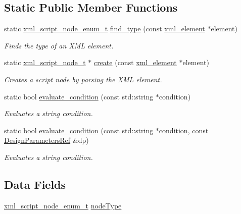 \subsection*{Static Public Member Functions}
\begin{DoxyCompactItemize}
\item 
static \hyperlink{xml__script__command_8hpp_a3f764b80e60a34ae77719e7f4616a59b}{xml\+\_\+script\+\_\+node\+\_\+enum\+\_\+t} \hyperlink{classxml__script__node__t_aca8e03906a47471b458570a203829aa3}{find\+\_\+type} (const \hyperlink{classxml__element}{xml\+\_\+element} $\ast$element)
\begin{DoxyCompactList}\small\item\em Finds the type of an X\+ML element. \end{DoxyCompactList}\item 
static \hyperlink{classxml__script__node__t}{xml\+\_\+script\+\_\+node\+\_\+t} $\ast$ \hyperlink{classxml__script__node__t_aed7d38abc27f6750b763da3ccd7b4b87}{create} (const \hyperlink{classxml__element}{xml\+\_\+element} $\ast$element)
\begin{DoxyCompactList}\small\item\em Creates a script node by parsing the X\+ML element. \end{DoxyCompactList}\item 
static bool \hyperlink{classxml__script__node__t_a01f5c0deca615d53775e40a512be3226}{evaluate\+\_\+condition} (const std\+::string $\ast$condition)
\begin{DoxyCompactList}\small\item\em Evaluates a string condition. \end{DoxyCompactList}\item 
static bool \hyperlink{classxml__script__node__t_ad27af696d98812f71634159dd6f5052c}{evaluate\+\_\+condition} (const std\+::string $\ast$condition, const \hyperlink{DesignParameters_8hpp_ae36bb1c4c9150d0eeecfe1f96f42d157}{Design\+Parameters\+Ref} \&dp)
\begin{DoxyCompactList}\small\item\em Evaluates a string condition. \end{DoxyCompactList}\end{DoxyCompactItemize}
\subsection*{Data Fields}
\begin{DoxyCompactItemize}
\item 
\hyperlink{xml__script__command_8hpp_a3f764b80e60a34ae77719e7f4616a59b}{xml\+\_\+script\+\_\+node\+\_\+enum\+\_\+t} \hyperlink{classxml__script__node__t_aaf981f64fd03ed4d8afbacd9f1cdbe2c}{node\+Type}
\end{DoxyCompactItemize}


